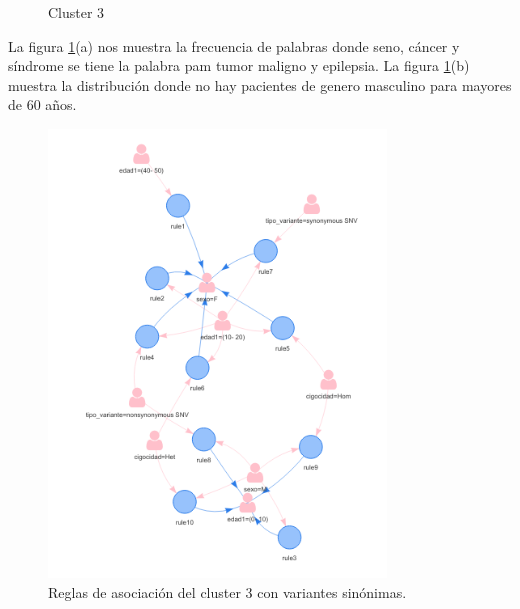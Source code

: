 \begin{figure}[h]
	\centering
	\caption{Cluster 3} \label{fig:c3}
\end{figure}

La figura \ref{fig:c3}(a) nos muestra la frecuencia de palabras donde seno, cáncer y síndrome se tiene la palabra pam tumor maligno y epilepsia. La figura \ref{fig:c3}(b) muestra la distribución donde no hay pacientes de genero masculino para mayores de 60 años.  

\begin{figure}[H]
	\centering
	\includegraphics[width=0.8\textwidth]{Kap4/reglas3_1}
	\caption{Reglas de asociación del cluster 3 con variantes sinónimas.} \label{fig:r3}
\end{figure}

